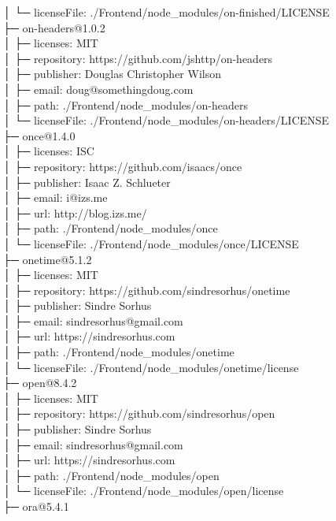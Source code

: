 │  └─ licenseFile: ./Frontend/node\_modules/on-finished/LICENSE\\
├─ on-headers@1.0.2\\
│  ├─ licenses: MIT\\
│  ├─ repository: https://github.com/jshttp/on-headers\\
│  ├─ publisher: Douglas Christopher Wilson\\
│  ├─ email: doug@somethingdoug.com\\
│  ├─ path: ./Frontend/node\_modules/on-headers\\
│  └─ licenseFile: ./Frontend/node\_modules/on-headers/LICENSE\\
├─ once@1.4.0\\
│  ├─ licenses: ISC\\
│  ├─ repository: https://github.com/isaacs/once\\
│  ├─ publisher: Isaac Z. Schlueter\\
│  ├─ email: i@izs.me\\
│  ├─ url: http://blog.izs.me/\\
│  ├─ path: ./Frontend/node\_modules/once\\
│  └─ licenseFile: ./Frontend/node\_modules/once/LICENSE\\
├─ onetime@5.1.2\\
│  ├─ licenses: MIT\\
│  ├─ repository: https://github.com/sindresorhus/onetime\\
│  ├─ publisher: Sindre Sorhus\\
│  ├─ email: sindresorhus@gmail.com\\
│  ├─ url: https://sindresorhus.com\\
│  ├─ path: ./Frontend/node\_modules/onetime\\
│  └─ licenseFile: ./Frontend/node\_modules/onetime/license\\
├─ open@8.4.2\\
│  ├─ licenses: MIT\\
│  ├─ repository: https://github.com/sindresorhus/open\\
│  ├─ publisher: Sindre Sorhus\\
│  ├─ email: sindresorhus@gmail.com\\
│  ├─ url: https://sindresorhus.com\\
│  ├─ path: ./Frontend/node\_modules/open\\
│  └─ licenseFile: ./Frontend/node\_modules/open/license\\
├─ ora@5.4.1\\
